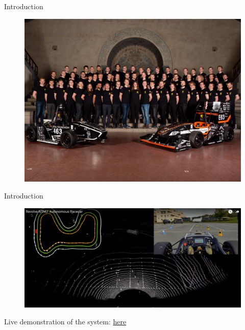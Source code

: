     \begin{frame}{Introduction}
                \begin{figure}
                    \centering
                    \includegraphics[width=0.65 \textwidth]{figures/revolve.jpg}
                \end{figure}
    \end{frame}

    \begin{frame}{Introduction}
                \begin{figure}
                    \centering
                    \includegraphics[width=0.90 \textwidth]{figures/revolve_video.png}
                \end{figure}
            Live demonstration of the system: \href{https://www.youtube.com/watch?v=_2T3MFnWG7A&t=44s&ab_channel=RevolveNTNU}{here}
    \end{frame}

